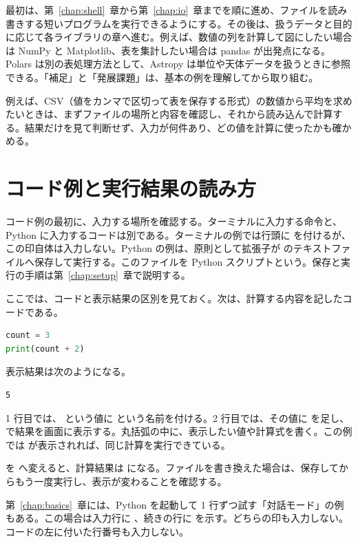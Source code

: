最初は、第~\ref{chap:shell}~章から第~\ref{chap:io}~章までを順に進め、ファイルを読み書きする短いプログラムを実行できるようにする。その後は、扱うデータと目的に応じて各ライブラリの章へ進む。例えば、数値の列を計算して図にしたい場合は NumPy と Matplotlib、表を集計したい場合は pandas が出発点になる。Polars は別の表処理方法として、Astropy は単位や天体データを扱うときに参照できる。「補足」と「発展課題」は、基本の例を理解してから取り組む。

例えば、CSV（値をカンマで区切って表を保存する形式）の数値から平均を求めたいときは、まずファイルの場所と内容を確認し、それから読み込んで計算する。結果だけを見て判断せず、入力が何件あり、どの値を計算に使ったかも確かめる。

\section{コード例と実行結果の読み方}

コード例の最初に、入力する場所を確認する。ターミナルに入力する命令と、Python に入力するコードは別である。ターミナルの例では行頭に \code{\$} を付けるが、この印自体は入力しない。Python の例は、原則として拡張子が  のテキストファイルへ保存して実行する。このファイルを Python スクリプトという。保存と実行の手順は第~\ref{chap:setup}~章で説明する。

ここでは、コードと表示結果の区別を見ておく。次は、計算する内容を記したコードである。

\begin{lstlisting}[language=Python]
count = 3
print(count + 2)
\end{lstlisting}

表示結果は次のようになる。

\begin{lstlisting}[numbers=none, xleftmargin=2\zw]
5
\end{lstlisting}

1 行目では、 という値に  という名前を付ける。2 行目では、その値に  を足し、 で結果を画面に表示する。丸括弧の中に、表示したい値や計算式を書く。この例では  が表示されれば、同じ計算を実行できている。

 を  へ変えると、計算結果は  になる。ファイルを書き換えた場合は、保存してからもう一度実行し、表示が変わることを確認する。

第~\ref{chap:basics}~章には、Python を起動して 1 行ずつ試す「対話モード」の例もある。この場合は入力行に \code{>>>}、続きの行に  を示す。どちらの印も入力しない。コードの左に付いた行番号も入力しない。

